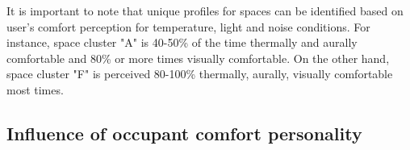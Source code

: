 It is important to note that unique profiles for spaces can be identified based on user's comfort perception for temperature, light and noise conditions. For instance, space cluster "A" is 40-50\% of the time thermally and aurally comfortable and 80\% or more times visually comfortable. On the other hand, space cluster "F" is perceived 80-100\% thermally, aurally, visually comfortable most times.           




\subsection{Influence of occupant comfort personality}


